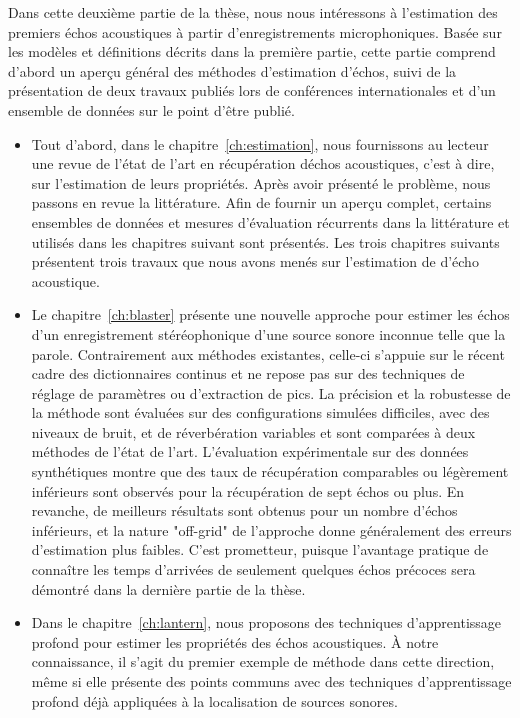 Dans cette deuxième partie de la thèse, nous nous intéressons à l'estimation des premiers échos acoustiques à partir d'enregistrements microphoniques.
Basée sur les modèles et définitions décrits dans la première partie, cette partie comprend d'abord un aperçu général des méthodes d'estimation d'échos, suivi de la présentation de deux travaux publiés lors de conférences internationales et d'un ensemble de données sur le point d'être publié.
\begin{itemize}
    \item
    Tout d'abord, dans le chapitre~\ref{ch:estimation}, nous fournissons au lecteur une revue de l'état de l'art en récupération déchos acoustiques, c'est à dire, sur l'estimation de leurs propriétés.
    Après avoir présenté le problème, nous passons en revue la littérature.
    Afin de fournir un aperçu complet, certains ensembles de données et mesures d'évaluation récurrents dans la littérature et utilisés dans les chapitres suivant sont présentés.
    Les trois chapitres suivants présentent trois travaux que nous avons menés sur l'estimation de d'écho acoustique.
    \item
    Le chapitre~\ref{ch:blaster} présente une nouvelle approche pour estimer les échos d'un enregistrement stéréophonique d'une source sonore inconnue telle que la parole.
    Contrairement aux méthodes existantes, celle-ci s'appuie sur le récent cadre des dictionnaires continus et ne repose pas sur des techniques de réglage de paramètres ou d'extraction de pics.
    La précision et la robustesse de la méthode sont évaluées sur des configurations simulées difficiles, avec des niveaux de bruit, et de réverbération variables et sont comparées à deux méthodes de l'état de l'art.
    L'évaluation expérimentale sur des données synthétiques montre que des taux de récupération comparables ou légèrement inférieurs sont observés pour la récupération de sept échos ou plus.
    En revanche, de meilleurs résultats sont obtenus pour un nombre d'échos inférieurs, et la nature "off-grid" de l'approche donne généralement des erreurs d'estimation plus faibles.
    C'est prometteur, puisque l'avantage pratique de connaître les temps d'arrivées de seulement quelques échos précoces sera démontré dans la dernière partie de la thèse.
    \item
    Dans le chapitre~\ref{ch:lantern}, nous proposons des techniques d'apprentissage profond pour estimer les propriétés des échos acoustiques.
    À notre connaissance, il s'agit du premier exemple de méthode dans cette direction, même si elle présente des points communs avec des techniques d'apprentissage profond déjà appliquées à la localisation de sources sonores.

\end{itemize}
